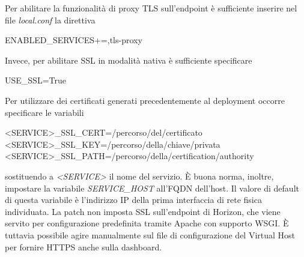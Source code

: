 \documentclass[../main.tex]{subfiles}
\begin{document}
Per abilitare la funzionalità di proxy TLS sull'endpoint è sufficiente inserire nel file \textit{local.conf} la direttiva
\begin{python}
ENABLED_SERVICES+=,tls-proxy
\end{python}

Invece, per abilitare SSL in modalità nativa è sufficiente specificare
\begin{python}
USE_SSL=True
\end{python}

Per utilizzare dei certificati generati precedentemente al deployment occorre specificare le variabili
\begin{python}
<SERVICE>\_SSL_CERT=/percorso/del/certificato
<SERVICE>\_SSL_KEY=/percorso/della/chiave/privata
<SERVICE>\_SSL_PATH=/percorso/della/certification/authority
\end{python}
sostituendo a \textit{<SERVICE>} il nome del servizio.
\`E buona norma, inoltre, impostare la variabile \textit{SERVICE\_HOST} all'FQDN dell'host. Il valore di default di questa variabile è l'indirizzo IP della prima interfaccia di rete fisica individuata.
La patch non imposta SSL sull'endpoint di Horizon, che viene servito per configurazione predefinita tramite Apache con supporto WSGI.
\`E tuttavia possibile agire manualmente sul file di configurazione del Virtual Host per fornire HTTPS anche sulla dashboard.
\vfill
\end{document}
